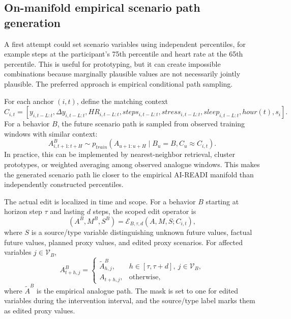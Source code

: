 \subsection{On-manifold empirical scenario path generation}
\label{subsec:on_manifold_generation}

A first attempt could set scenario variables using independent percentiles, for example steps at the participant's 75th percentile and heart rate at the 65th percentile. This is useful for prototyping, but it can create impossible combinations because marginally plausible values are not necessarily jointly plausible. The preferred approach is empirical conditional path sampling.

For each anchor $(i,t)$, define the matching context
\begin{equation}
    C_{i,t} = \left[
    y_{i,t-L:t},
    \Delta y_{i,t-L:t},
    HR_{i,t-L:t},
    steps_{i,t-L:t},
    stress_{i,t-L:t},
    sleep_{i,t-L:t},
    hour(t),
    s_i
    \right].
    \label{eq:matching_context}
\end{equation}
For a behavior $B$, the future scenario path is sampled from observed training windows with similar context:
\begin{equation}
    A^{B}_{i,t+1:t+H}
    \sim
    p_{train}\left(A_{u+1:u+H}\mid B_u=B, C_u \approx C_{i,t}\right).
    \label{eq:empirical_scenario_sampling}
\end{equation}
In practice, this can be implemented by nearest-neighbor retrieval, cluster prototypes, or weighted averaging among observed analogue windows. This makes the generated scenario path lie closer to the empirical AI-READI manifold than independently constructed percentiles.

The actual edit is localized in time and scope. For a behavior $B$ starting at horizon step $\tau$ and lasting $d$ steps, the scoped edit operator is
\begin{equation}
    (A^B,M^B,S^B)
    = \mathcal{E}_{B,\tau,d}(A,M,S;C_{i,t}),
    \label{eq:edit_operator}
\end{equation}
where $S$ is a source/type variable distinguishing unknown future values, factual future values, planned proxy values, and edited proxy scenarios. For affected variables $j\in\mathcal{V}_B$,
\begin{equation}
    A^B_{t+h,j}
    =
    \begin{cases}
        \tilde{A}^{B}_{h,j}, & h\in[\tau,\tau+d],\ j\in\mathcal{V}_B, \\
        A_{t+h,j}, & \mathrm{otherwise},
    \end{cases}
\end{equation}
where $\tilde{A}^{B}$ is the empirical analogue path. The mask is set to one for edited variables during the intervention interval, and the source/type label marks them as edited proxy values.

